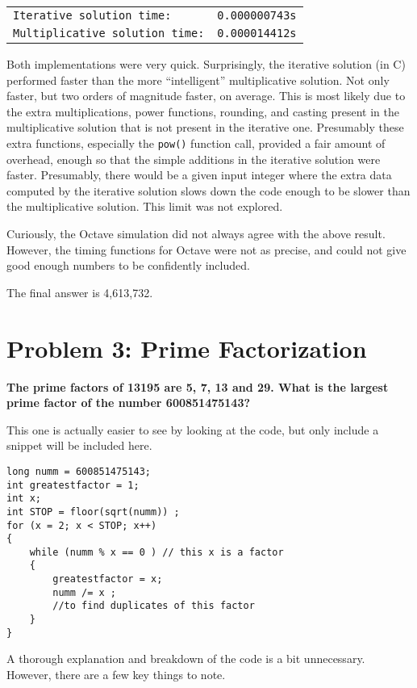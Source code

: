 \documentclass{article}
\begin{document}
\begin{tabular}{ll}
\texttt{Iterative solution time:}		&	\texttt{0.000000743s}	\\
\texttt{Multiplicative solution time:}	&	\texttt{0.000014412s}
\end{tabular}

Both implementations were very quick. Surprisingly, the iterative solution (in C) performed 
faster than the more ``intelligent'' multiplicative solution. Not only faster, but two orders 
of magnitude faster, on average. This is most likely due to the extra multiplications, power 
functions, rounding, and casting present in the multiplicative solution that is not present 
in the iterative one. Presumably these extra functions, especially the \texttt{pow()} 
function call, provided a fair amount of overhead, enough so that the simple additions
in the iterative solution were faster. Presumably, there would be a given input integer where 
the extra data computed by the iterative solution slows down the code enough to be slower 
than the multiplicative solution. This limit was not explored.

Curiously, the Octave simulation did not always agree with the above result. However, the 
timing functions for Octave were not as precise, and could not give good enough numbers to be 
confidently included.

The final answer is 4,613,732.

\section{Problem 3: Prime Factorization}

\textbf{The prime factors of 13195 are 5, 7, 13 and 29. What is the largest prime factor
of the number 600851475143?}

\bigskip

This one is actually easier to see by looking at the code, but only include a snippet will be 
included here.

\begin{lstlisting}
long numm = 600851475143;
int greatestfactor = 1;
int x;
int STOP = floor(sqrt(numm)) ;
for (x = 2; x < STOP; x++)
{
	while (numm % x == 0 ) // this x is a factor
	{
		greatestfactor = x;
		numm /= x ;
		//to find duplicates of this factor
	}
}
\end{lstlisting}

A thorough explanation and breakdown of the code is a bit unnecessary. However, there are a 
few key things to note.
\end{document}
